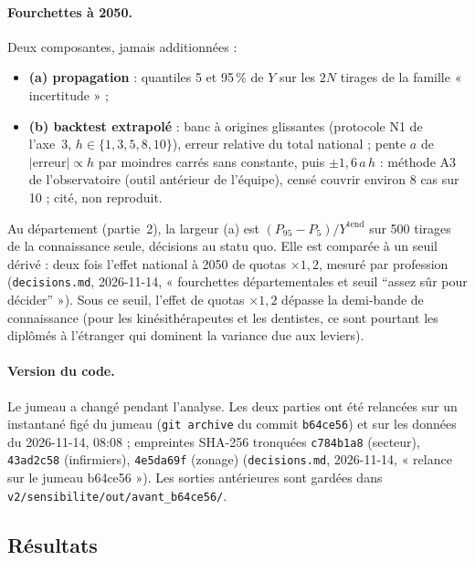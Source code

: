 \paragraph{Fourchettes à 2050.} Deux composantes, jamais additionnées :
\begin{itemize}
  \item \textbf{(a) propagation} : quantiles 5 et 95\,\% de $Y$ sur les $2N$ tirages de la famille
        « incertitude » ;
  \item \textbf{(b) backtest extrapolé} : banc à origines glissantes (protocole N1 de l'axe~3,
        $h \in \{1, 3, 5, 8, 10\}$), erreur relative du total national ; pente $a$ de $|\text{erreur}| \propto h$
        par moindres carrés sans constante, puis $\pm 1{,}6\, a\, h$ : méthode A3 de l'observatoire (outil antérieur
        de l'équipe), censé couvrir environ 8 cas sur 10 ; cité, non reproduit.
\end{itemize}
Au département (partie~2), la largeur (a) est $(P_{95} - P_5)/Y^{\text{tend}}$ sur 500 tirages de la connaissance
seule, décisions au statu quo. Elle est comparée à un seuil dérivé : deux fois l'effet national à 2050 de quotas
$\times 1{,}2$, mesuré par profession (\texttt{decisions.md}, 2026-11-14, « fourchettes départementales et seuil
\enquote{assez sûr pour décider} »). Sous ce seuil, l'effet de quotas $\times 1{,}2$ dépasse la demi-bande de
connaissance (pour les kinésithérapeutes et les dentistes, ce sont pourtant les diplômés à l'étranger qui dominent
la variance due aux leviers).

\paragraph{Version du code.} Le jumeau a changé pendant l'analyse. Les deux parties ont été relancées sur un
instantané figé du jumeau (\texttt{git archive} du commit \texttt{b64ce56}) et sur les données du 2026-11-14,
08:08 ; empreintes SHA-256 tronquées \texttt{c784b1a8} (secteur), \texttt{43ad2c58} (infirmiers),
\texttt{4e5da69f} (zonage) (\texttt{decisions.md}, 2026-11-14, « relance sur le jumeau b64ce56 »). Les sorties
antérieures sont gardées dans \texttt{v2/sensibilite/out/avant\_b64ce56/}.

\subsection{Résultats}\label{sen:resultats}

